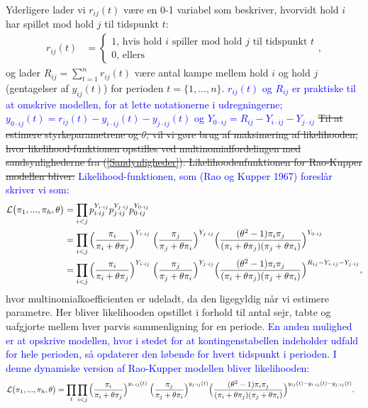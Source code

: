 \documentclass[11pt,a4paper]{article}
\begin{document}
Yderligere lader vi $r_{ij}(t)$ være en 0-1 variabel som beskriver, hvorvidt hold $i$ har spillet mod hold $j$ til tidspunkt $t$:
\begin{align*}
r_{ij}(t)&=\begin{cases}
1\text{, hvis hold $i$ spiller mod hold $j$ til tidspunkt $t$}\\
0\text{, ellers}
\end{cases},
\end{align*}
og lader $R_{ij}=\sum_{t=1}^nr_{ij}(t)$ være antal kampe mellem hold $i$ og hold $j$ (gentagelser af $y_{ij}(t)$) for perioden $t=\{1,...,n\}$. \textcolor{blue}{$r_{ij}(t)$ og $R_{ij}$ er praktiske til at omskrive modellen, for at lette notationerne i udregningerne; $y_{0\cdot ij}(t)=r_{ij}(t)-y_{i\cdot ij}(t)-y_{j\cdot ij}(t)$ og $Y_{0\cdot ij}=R_{ij}-Y_{i\cdot ij}-Y_{j\cdot ij}$}
\sout{Til at estimere styrkeparametrene og $\theta$, vil vi gøre brug af maksimering af likelihooden, hvor likelihood-funktionen opstilles ved multinomialfordelingen med sandsynlighederne fra (\ref{Sandynligheder}). Likelihoodenfunktionen for Rao-Kupper modellen bliver:}
\textcolor{blue}{Likelihood-funktionen, som (Rao og Kupper 1967) foreslår skriver vi som:}
\begin{align*}
\mathcal{L}\big{(}\pi_1,...,\pi_h,\theta\big{)} &= \prod_{i<j}p_{i\cdot ij}^{Y_{i\cdot ij}}p_{j\cdot ij}^{Y_{j\cdot ij}}p_{0\cdot ij}^{Y_{0\cdot ij}}\\
&= \prod_{i<j}\Big{(}\frac{\pi_i}{\pi_i+\theta\pi_j}\Big{)}^{Y_{i\cdot ij}}
\;\Big{(}\frac{\pi_j}{\pi_j+\theta\pi_i}\Big{)}^{Y_{j\cdot ij}}
\Big{(}\frac{(\theta^2-1)\pi_i \pi_j}{(\pi_i+\theta\pi_j)(\pi_j+\theta\pi_i)}\Big{)}^{Y_{0\cdot ij}}\\
&=\prod_{i<j}\Big{(}\frac{\pi_i}{\pi_i+\theta\pi_j}\Big{)}^{Y_{i\cdot ij}}
\;\Big{(}\frac{\pi_j}{\pi_j+\theta\pi_i}\Big{)}^{Y_{j\cdot ij}}
\Big{(}\frac{(\theta^2-1)\pi_i \pi_j}{(\pi_i+\theta\pi_j)(\pi_j+\theta\pi_i)}\Big{)}^{R_{ij}-{Y_{i\cdot ij}}-{Y_{j\cdot ij}}},\\
\end{align*}
hvor multinomialkoefficienten er udeladt, da den ligegyldig når vi estimere parametre. Her bliver likelihooden opstillet i forhold til antal sejr, tabte og uafgjorte mellem hver parvis sammenligning for en periode.\textcolor{blue}{ En anden mulighed er at opskrive modellen, hvor i stedet for at kontingenstabellen indeholder udfald for hele perioden, så opdaterer den løbende for hvert tidspunkt i perioden. I denne dynamiske version af Rao-Kupper modellen bliver likelihooden:}
\begin{align*}
\mathcal{L}\big{(}\pi_1,...,\pi_h,\theta\big{)}
&=\prod_t\prod_{i<j}\Big{(}\frac{\pi_i}{\pi_i+\theta\pi_j}\Big{)}^{y_{i\cdot ij}(t)}
\;\Big{(}\frac{\pi_j}{\pi_j+\theta\pi_i}\Big{)}^{y_{j\cdot ij}(t)}
\Big{(}\frac{(\theta^2-1)\pi_i \pi_j}{(\pi_i+\theta\pi_j)(\pi_j+\theta\pi_i)}\Big{)}^{y_{ij}(t)-{y_{i\cdot ij}(t)}-{y_{j\cdot ij}(t)}}.
\end{align*}
\end{document}
